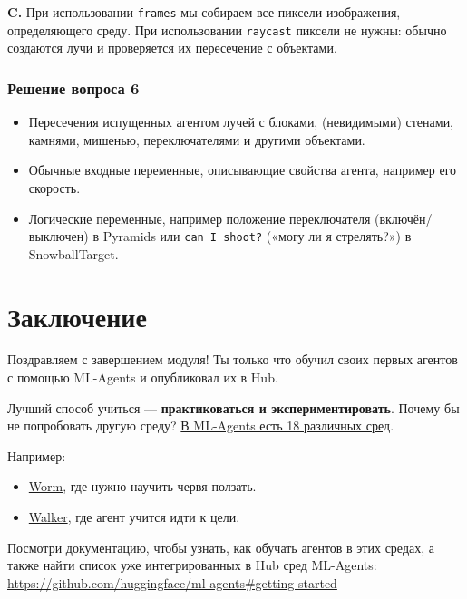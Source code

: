 \documentclass[11pt,a4paper]{article}
\begin{document}
\textbf{C.} При использовании \texttt{frames} мы собираем все пиксели изображения, определяющего среду. При использовании \texttt{raycast} пиксели не нужны: обычно создаются лучи и проверяется их пересечение с объектами.

\subsubsection{Решение вопроса 6}\label{q6-solution}

\begin{itemize}
\tightlist
\item
  Пересечения испущенных агентом лучей с блоками, (невидимыми) стенами, камнями, мишенью, переключателями и другими объектами.
\item
  Обычные входные переменные, описывающие свойства агента, например его скорость.
\item
  Логические переменные, например положение переключателя (включён/выключен) в Pyramids или \texttt{can\ I\ shoot?} («могу ли я стрелять?») в SnowballTarget.
\end{itemize}

\section{Заключение}\label{conclusion}

Поздравляем с завершением модуля! Ты только что обучил своих первых агентов с помощью ML-Agents и опубликовал их в Hub.

Лучший способ учиться --- \textbf{практиковаться и экспериментировать}. Почему бы не попробовать другую среду? \href{https://github.com/Unity-Technologies/ml-agents/blob/develop/docs/Learning-Environment-Examples.md}{В ML-Agents есть 18 различных сред}.

Например:

\begin{itemize}
\tightlist
\item
  \href{https://singularite.itch.io/worm}{Worm}, где нужно научить червя ползать.
\item
  \href{https://singularite.itch.io/walker}{Walker}, где агент учится идти к цели.
\end{itemize}

Посмотри документацию, чтобы узнать, как обучать агентов в этих средах, а также найти список уже интегрированных в Hub сред ML-Agents: \url{https://github.com/huggingface/ml-agents#getting-started}

\end{document}

